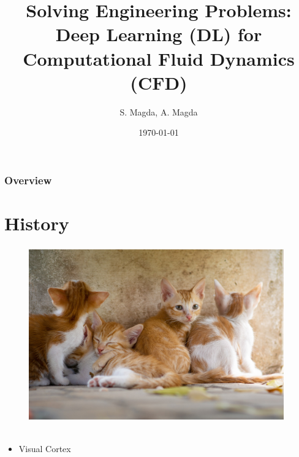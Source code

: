 \documentclass{beamer}
\title[CFD\&DL]{Solving Engineering Problems: Deep Learning (DL) for Computational Fluid Dynamics (CFD)} %
\author{S. Magda, A. Magda} %
\institute[] %
{
n.g.\\ %
\medskip
\textit{} %
}
\date{\today} %
\begin{document}
\begin{frame}
\titlepage %
\end{frame}

\begin{frame}
\frametitle{Overview} %
\tableofcontents %
\end{frame}


\section{History} %

\begin{frame}
\frametitle{}%
\begin{figure}[h]
\includegraphics[width=11cm]{img/cats-pixabay01.jpg}
\caption{ ~\parencite{imageCats}}
\end{figure}
\begin{itemize}
 \item Visual Cortex ~\parencite{hubel1959receptive}
\end{itemize}
\end{frame}
\end{document}
